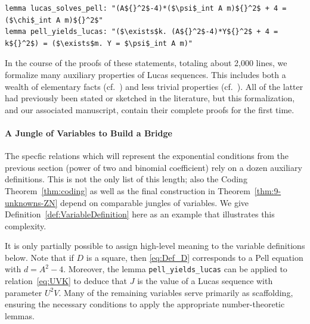 \documentclass[a4paper,USenglish,cleveref,autoref,thm-restate]{lipics-v2021}
\begin{document}
\begin{lstlisting}
lemma lucas_solves_pell: "(A${}^2$-4)*($\psi$_int A m)${}^2$ + 4 = ($\chi$_int A m)${}^2$"
lemma pell_yields_lucas: "($\exists$k. (A${}^2$-4)*Y${}^2$ + 4 = k${}^2$) = ($\exists$m. Y = $\psi$_int A m)"
\end{lstlisting}
In the course of the proofs of these statements, totaling about 2,000 lines, we formalize many auxiliary properties of Lucas sequences. This includes both a wealth of elementary facts (cf.~\cite[Lemma~3.4]{manuscript}) and less trivial properties (cf.~\cite[Lemmas~3.7--3.12]{manuscript}). All of the latter had previously been stated or sketched in the literature, but this formalization, and our associated manuscript, contain their complete proofs for the first time.

\paragraph*{A Jungle of Variables to Build a Bridge}

The specfic relations which will represent the exponential conditions from the previous section (power of two and binomial coefficient) rely on a dozen auxiliary definitions. This is not the only list of this length; also the Coding Theorem~\ref{thm:coding} as well as the final construction in Theorem~\ref{thm:9-unknowns-ZN} depend on comparable jungles of variables. We give Definition~\ref{def:VariableDefinition} here as an example that illustrates this complexity.

It is only partially possible to assign high-level meaning to the variable definitions below. Note that if $D$ is a square, then \cref{eq:Def_D} corresponds to a Pell equation with $d = A^2 - 4$. Moreover, the lemma \texttt{pell\_yields\_lucas} can be applied to relation~\eqref{eq:UVK} to deduce that $J$ is the value of a Lucas sequence with parameter $U^2V$. Many of the remaining variables serve primarily as scaffolding, ensuring the necessary conditions to apply the appropriate number-theoretic lemmas.
\end{document}

